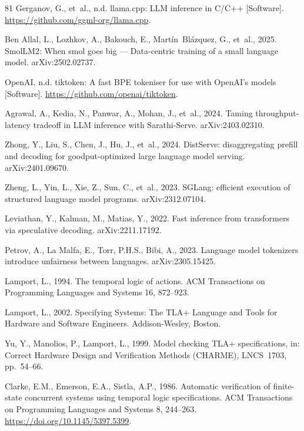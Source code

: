 \documentclass[final,5p,times,twocolumn,number]{elsarticle}
\begin{document}
\begin{thebibliography}{81}
Gerganov, G., et~al., n.d. llama.cpp: LLM inference in C/C++ [Software].
\url{https://github.com/ggml-org/llama.cpp}.

Ben Allal, L., Lozhkov, A., Bakouch, E., Mart\'{i}n~Bl\'{a}zquez, G., et~al., 2025.
SmolLM2: When smol goes big --- Data-centric training of a small language model.
arXiv:2502.02737.

OpenAI, n.d. tiktoken: A fast BPE tokeniser for use with OpenAI's models [Software].
\url{https://github.com/openai/tiktoken}.

Agrawal, A., Kedia, N., Panwar, A., Mohan, J., et~al., 2024. Taming throughput-latency tradeoff in LLM inference with Sarathi-Serve. arXiv:2403.02310.

Zhong, Y., Liu, S., Chen, J., Hu, J., et~al., 2024. DistServe: disaggregating prefill and decoding for goodput-optimized large language model serving. arXiv:2401.09670.

Zheng, L., Yin, L., Xie, Z., Sun, C., et~al., 2023. SGLang: efficient execution of structured language model programs. arXiv:2312.07104.

Leviathan, Y., Kalman, M., Matias, Y., 2022. Fast inference from transformers via speculative decoding. arXiv:2211.17192.

Petrov, A., La Malfa, E., Torr, P.H.S., Bibi, A., 2023. Language model tokenizers introduce unfairness between languages. arXiv:2305.15425.

Lamport, L., 1994. The temporal logic of actions. ACM Transactions on Programming
Languages and Systems 16, 872--923.

Lamport, L., 2002. Specifying Systems: The TLA+ Language and Tools for Hardware and Software Engineers. Addison-Wesley, Boston.

Yu, Y., Manolios, P., Lamport, L., 1999. Model checking TLA+ specifications, in:
Correct Hardware Design and Verification Methods (CHARME), LNCS~1703, pp.~54--66.

Clarke, E.M., Emerson, E.A., Sistla, A.P., 1986. Automatic verification of finite-state concurrent systems using temporal logic specifications. ACM Transactions on Programming Languages and Systems 8, 244--263. \url{https://doi.org/10.1145/5397.5399}.


\end{thebibliography}
\end{document}
